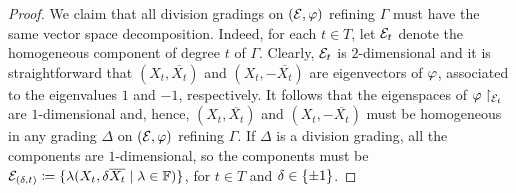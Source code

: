 \begin{proof}
    We claim that all division gradings on $(\mathcal E, \varphi)$ refining $\Gamma$ must have the same vector space decomposition. 
    Indeed, for each $t\in T$, let $\mathcal E_t$ denote the homogeneous component of degree $t$ of $\Gamma$. 
    Clearly, $\mathcal E_t$ is $2$-dimensional and it is straightforward that $(X_t, \overline{X_t})$ and $(X_t, -\overline{X_t})$ are eigenvectors of $\varphi$, associated to the eigenvalues $1$ and $-1$, respectively. 
    It follows that the eigenspaces of $\varphi \restriction_{\mathcal E_t}$ are $1$-dimensional and, hence, $(X_t, \overline{X_t})$ and $(X_t, -\overline{X_t})$ must be homogeneous in any grading $\Delta$ on $(\mathcal E, \varphi)$ refining $\Gamma$. 
    If $\Delta$ is a division grading, all the components are $1$-dimensional, so the components must be $\mathcal E_{(\delta, t)} \coloneqq \{ \lambda (X_t, \delta \overline{X_t} \mid \lambda \in \mathbb{F})\}$, for $t\in T$ and $\delta \in \{ \pm 1 \}$.
    
    
    

\end{proof}
